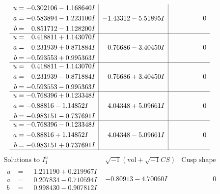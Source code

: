 \documentclass[1p]{elsarticle_modified}
\theoremstyle{definition}
\newcommand{\I}{\sqrt{-1}}
\begin{document}
$$\begin{array}{c|c|c}
\begin{aligned}
u &= -0.302106 - 1.168640 I \\
a &= -0.583894 - 1.223100 I \\
b &= \phantom{-}0.851712 - 1.128200 I\end{aligned}
 & -1.43312 - 5.51895 I & \phantom{-0.000000 } 0 \\ \hline\begin{aligned}
u &= \phantom{-}0.418811 + 1.143070 I \\
a &= \phantom{-}0.231939 + 0.871884 I \\
b &= -0.593553 + 0.995363 I\end{aligned}
 & \phantom{-}0.76686 - 3.40450 I & \phantom{-0.000000 } 0 \\ \hline\begin{aligned}
u &= \phantom{-}0.418811 - 1.143070 I \\
a &= \phantom{-}0.231939 - 0.871884 I \\
b &= -0.593553 - 0.995363 I\end{aligned}
 & \phantom{-}0.76686 + 3.40450 I & \phantom{-0.000000 } 0 \\ \hline\begin{aligned}
u &= -0.768396 + 0.123348 I \\
a &= -0.88816 - 1.14852 I \\
b &= -0.983151 - 0.737691 I\end{aligned}
 & \phantom{-}4.04348 + 5.09661 I & \phantom{-0.000000 } 0 \\ \hline\begin{aligned}
u &= -0.768396 - 0.123348 I \\
a &= -0.88816 + 1.14852 I \\
b &= -0.983151 + 0.737691 I\end{aligned}
 & \phantom{-}4.04348 - 5.09661 I & \phantom{-0.000000 } 0\\
 \hline 
 \end{array}$$\newpage$$\begin{array}{c|c|c}  
\text{Solutions to }I^u_{1}& \I (\text{vol} + \sqrt{-1}CS) & \text{Cusp shape}\\
 \hline 
\begin{aligned}
u &= \phantom{-}1.211190 + 0.219967 I \\
a &= \phantom{-}0.207834 - 0.710594 I \\
b &= \phantom{-}0.998430 - 0.907812 I\end{aligned}
 & -0.80913 - 4.70060 I & \phantom{-0.000000 } 0 \\ \hline\begin{aligned}

\end{aligned}
\end{array}$$
\end{document}

